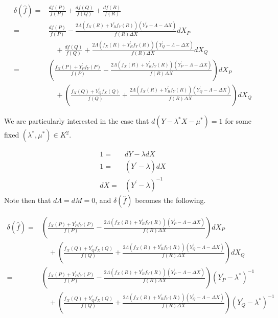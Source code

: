 \documentclass[11pt,letterpaper]{article}
\theoremstyle{definition}
\newcommand{\6}{\mathbf}
\newcommand{\7}{\mathcal}
\begin{document}
\begin{align}
\delta(\widehat{f}) =& \frac{df(P)}{f(P)} + \frac{df(Q)}{f(Q)} + \frac{df(R)}{f(R)}  \\
=& \frac{df(P)}{f(P)}- \frac{2\Lambda(f_X(R) + Y_R^\prime f_Y(R))(Y_P^\prime - \Lambda - \Delta X)}{f(R)\Delta X}dX_P \\& \quad + \frac{df(Q)}{f(Q)} + \frac{2\Lambda(f_X(R) + Y_R^\prime f_Y(R))(Y_Q^\prime - \Lambda - \Delta X)}{f(R) \Delta X}dX_Q \\
=& \left(\frac{f_X(P) + Y_P^\prime f_Y(P)}{f(P)}- \frac{2\Lambda(f_X(R) + Y_R^\prime f_Y(R))(Y_P^\prime - \Lambda - \Delta X)}{f(R)\Delta X}\right)dX_P \\&  \quad + \left(\frac{f_X(Q) + Y_Q^\prime f_X(Q)}{f(Q)} + \frac{2\Lambda(f_X(R) + Y_R^\prime f_Y(R))(Y_Q^\prime - \Lambda - \Delta X)}{f(R) \Delta X}\right)dX_Q  \label{deltawidehatf}
\end{align}

We are particularly interested in the case that $d(Y-\lambda^* X - \mu^*) = 1$ for some fixed $(\lambda^*, \mu^*) \in K^2$.

\begin{align}
1 =& dY - \lambda dX  \\
1 =& (Y^\prime - \lambda) dX \\
dX =& (Y^\prime - \lambda)^{-1}
\end{align}
Note then that $d\Lambda = dM = 0$, and $\delta(\widehat{f})$ becomes the following.

\begin{align}
\delta(\widehat{f}) =& \left(\frac{f_X(P) + Y_P^\prime f_Y(P)}{f(P)}- \frac{2\Lambda(f_X(R) + Y_R^\prime f_Y(R))(Y_P^\prime - \Lambda - \Delta X)}{f(R)\Delta X}\right)dX_P \\&  \quad + \left(\frac{f_X(Q) + Y_Q^\prime f_X(Q)}{f(Q)} + \frac{2\Lambda(f_X(R) + Y_R^\prime f_Y(R))(Y_Q^\prime - \Lambda - \Delta X)}{f(R) \Delta X}\right)dX_Q \\
=& \left(\frac{f_X(P) + Y_P^\prime f_Y(P)}{f(P)}- \frac{2\Lambda(f_X(R) + Y_R^\prime f_Y(R))(Y_P^\prime - \Lambda - \Delta X)}{f(R)\Delta X}\right)(Y_P^\prime - \lambda^*)^{-1} \\&  \quad + \left(\frac{f_X(Q) + Y_Q^\prime f_X(Q)}{f(Q)} + \frac{2\Lambda(f_X(R) + Y_R^\prime f_Y(R))(Y_Q^\prime - \Lambda - \Delta X)}{f(R) \Delta X}\right)(Y_Q^\prime - \lambda^*)^{-1}
\end{align}
\end{document}
